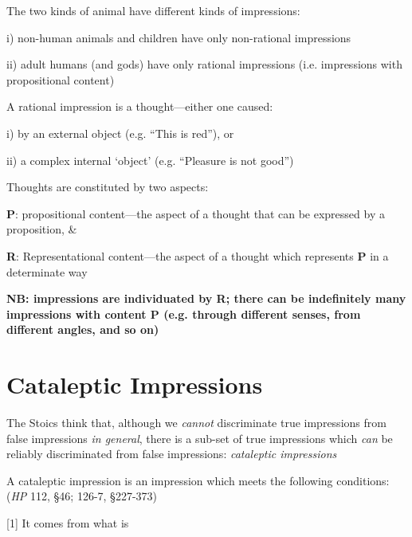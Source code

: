 \documentclass[11pt]{article}
\begin{document}
\noindent The two kinds of animal have different kinds of impressions:
\vspace*{2mm}

i) non-human animals and children have only non-rational impressions
\vspace*{1mm}

ii) adult humans (and gods) have only rational impressions (i.e. impressions with propositional content)
\vspace*{2mm}

\noindent A rational impression is a thought---either one caused:
\vspace*{2mm}

i) by an external object (e.g. ``This is red''), or
\vspace*{1mm}

ii) a complex internal `object' (e.g. ``Pleasure is not good'')
\vspace*{2mm}

\noindent Thoughts are constituted by two aspects:
\vspace*{2mm}

\textbf{P}: propositional content---the aspect of a thought that can be expressed by a proposition, \&
\vspace*{1mm}

\textbf{R}: Representational content---the aspect of a thought which represents \textbf{P} in a determinate way
\vspace*{2mm}

\noindent\textbf{NB: impressions are individuated by R; there can be indefinitely many impressions with content P (e.g. through different senses, from different angles, and so on)}


\section*{Cataleptic Impressions}

\noindent The Stoics think that, although we \emph{cannot} discriminate true impressions from false impressions \emph{in general}, there is a sub-set of true impressions which \emph{can} be reliably discriminated from false impressions: \emph{cataleptic impressions}
\vspace*{2mm}

\noindent A cataleptic impression is an impression which meets the following conditions: (\emph{HP} 112, \S46; 126-7, \S227-373)
\vspace*{2mm}

[1] It comes from what is
\vspace*{1mm}
\end{document}
